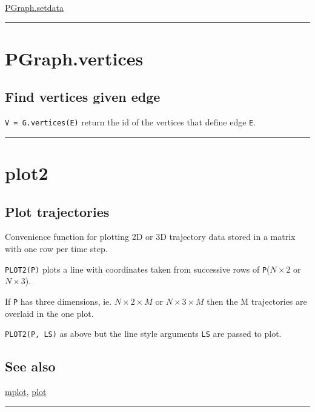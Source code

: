 \hyperlink{PGraph.setdata}{\color{blue} PGraph.setdata}

\vspace{1.5ex}\hrule

\hypertarget{PGraph.vertices}{\section*{PGraph.vertices}}
\subsection*{Find vertices given edge}


\texttt{V = G.vertices(E)} return the id of the vertices that define edge \texttt{E}.

\vspace{1.5ex}\rule{\textwidth}{1mm}

\hypertarget{plot2}{\section*{plot2}}
\subsection*{Plot trajectories}


Convenience function for plotting 2D or 3D trajectory data stored in a
matrix with one row per time step.



\texttt{PLOT2(P)} plots a line with coordinates taken from successive rows of \texttt{P}($N \times 2$ or $N \times 3$).



If \texttt{P} has three dimensions, ie. $N \times 2 \times M$ or $N \times 3 \times M$ then the M trajectories are
overlaid in the one plot.



\texttt{PLOT2(P, LS)} as above but the line style arguments \texttt{LS} are passed to plot.


\subsection*{See also}


\hyperlink{mplot}{\color{blue} mplot}, \hyperlink{plot}{\color{blue} plot}

\vspace{1.5ex}\rule{\textwidth}{1mm}

